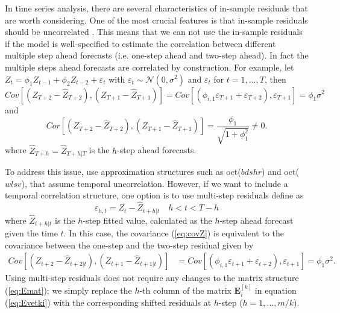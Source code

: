 \documentclass[a4paper,11pt]{article}
\newcommand{\Evet}{\bm{E}}
\theoremstyle{definition}
\begin{document}
In time series analysis, there are several characteristics of in-sample residuals that are worth considering. One of the most crucial features is that in-sample residuals should be uncorrelated \citep{tsay2014,hyndman2021}. %
This means that we can not use the in-sample residuals if the model is well-specified to estimate the correlation between different multiple step ahead forecasts (i.e. one-step ahead and two-step ahead). In fact the multiple steps ahead forecasts are correlated by construction. For example, let $Z_t = \phi_1 Z_{t-1} + \phi_2 Z_{t-2} + \varepsilon_t$ with $\varepsilon_t\sim \mathcal{N}(0, \sigma^2)$ and $\varepsilon_t$ for $t = 1,...,T$, then
\begin{equation}\label{eq:covZ}
	Cov\left[\left(Z_{T+2}-\widehat{Z}_{T+2}\right), \left(Z_{T+1}-\widehat{Z}_{T+1}\right)\right] = Cov\left[\left(\phi_{i, 1}\varepsilon_{T+1} + \varepsilon_{T+2}\right), \varepsilon_{T+1}\right] = \phi_{1}\sigma^2
\end{equation}
and
$$
Cor\left[\left(Z_{T+2}-\widehat{Z}_{T+2}\right), \left(Z_{T+1}-\widehat{Z}_{T+1}\right)\right] = \frac{\phi_{1}}{\sqrt{1+\phi_1^2}} \neq 0.
$$
where $\widehat{Z}_{T+h} = \widehat{Z}_{T+h|T}$ is the $h$-step ahead forecasts.

To address this issue, \cite{difonzo2023} use approximation structures such as oct($bdshr$) and oct($wlsv$), that assume temporal uncorrelation. However, if we want to include a temporal correlation structure, one option is to use multi-step residuals define as
$$
\varepsilon_{h,t} = Z_t - \widehat{Z}_{t+h|t}\quad h<t<T-h
$$
where $\widehat{Z}_{t+h|t}$ is the $h$-step fitted value, calculated as the $h$-step ahead forecast given the time $t$. In this case, the covariance (\ref{eq:covZ}) is equivalent to the covariance between the one-step and the two-step residual given by
\begin{equation*}
	\begin{aligned}
		Cov\left[\left(Z_{t+2}-\widehat{Z}_{t+2|t}\right), \left(Z_{t+1}-\widehat{Z}_{t+1|t}\right)\right] & = Cov\left[\left(\phi_{i, 1}\varepsilon_{t+1} + \varepsilon_{t+2}\right), \varepsilon_{t+1}\right] = \phi_{1}\sigma^2.
	\end{aligned}
\end{equation*}
Using multi-step residuals does not require any changes to the matrix structure (\ref{eq:Emat}); we simply replace the $h$-th column of the matrix $\Evet_i^{[k]}$ in equation (\ref{eq:Evetki}) with the corresponding shifted residuals at $h$-step ($h = 1, ..., m/k$).
\end{document}
